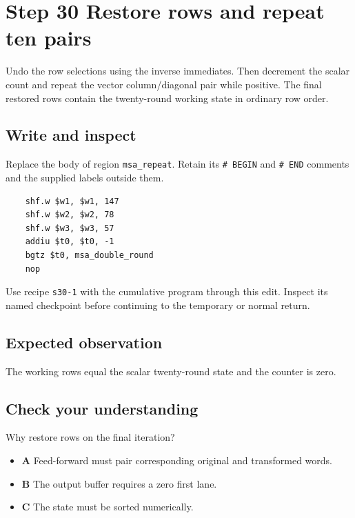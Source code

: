 \section{Step 30 Restore rows and repeat ten pairs}\label{chacha-s30}

Undo the row selections using the inverse immediates. Then decrement the scalar count and repeat the vector column/diagonal pair while positive. The final restored rows contain the twenty-round working state in ordinary row order.

\subsection{Write and inspect}
Replace the body of region \texttt{msa\_repeat}. Retain its \texttt{\# BEGIN} and \texttt{\# END} comments and the supplied labels outside them.

\begin{verbatim}
    shf.w $w1, $w1, 147
    shf.w $w2, $w2, 78
    shf.w $w3, $w3, 57
    addiu $t0, $t0, -1
    bgtz $t0, msa_double_round
    nop
\end{verbatim}

Use recipe \texttt{s30-1} with the cumulative program through this edit. Inspect its named checkpoint before continuing to the temporary or normal return.

\subsection{Expected observation}
The working rows equal the scalar twenty-round state and the counter is zero.

\subsection{Check your understanding}
Why restore rows on the final iteration?

\begin{itemize}
\item \textbf{A} Feed-forward must pair corresponding original and transformed words.
\item \textbf{B} The output buffer requires a zero first lane.
\item \textbf{C} The state must be sorted numerically.
\end{itemize}
